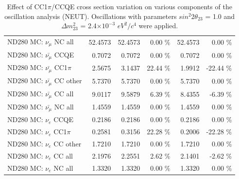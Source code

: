 \begin{table}
\begin{tabular}{| l | r | r  r | r  r |}
                                          ND280 MC: $\nu_{\mu}$ NC all &         52.4573 &         52.4573 &  0.00 \%  &         52.4573 &  0.00 \%  \\ 
                                      ND280 MC: $\bar{\nu_{\mu}}$ CCQE &          0.7072 &          0.7072 &  0.00 \%  &          0.7072 &  0.00 \%  \\ 
                                  ND280 MC: $\bar{\nu_{\mu}}$ CC1$\pi$ &          2.5675 &          3.1437 & 22.44 \%  &          1.9912 & -22.44 \%  \\ 
                                  ND280 MC: $\bar{\nu_{\mu}}$ CC other &          5.7370 &          5.7370 &  0.00 \%  &          5.7370 &  0.00 \%  \\ 
                                    ND280 MC: $\bar{\nu_{\mu}}$ CC all &          9.0117 &          9.5879 &  6.39 \%  &          8.4355 & -6.39 \%  \\ 
                                    ND280 MC: $\bar{\nu_{\mu}}$ NC all &          1.4559 &          1.4559 &  0.00 \%  &          1.4559 &  0.00 \%  \\ 
                                              ND280 MC: $\nu_{e}$ CCQE &          0.2186 &          0.2186 &  0.00 \%  &          0.2186 &  0.00 \%  \\ 
                                          ND280 MC: $\nu_{e}$ CC1$\pi$ &          0.2581 &          0.3156 & 22.28 \%  &          0.2006 & -22.28 \%  \\ 
                                          ND280 MC: $\nu_{e}$ CC other &          1.7210 &          1.7210 &  0.00 \%  &          1.7210 &  0.00 \%  \\ 
                                            ND280 MC: $\nu_{e}$ CC all &          2.1976 &          2.2551 &  2.62 \%  &          2.1401 & -2.62 \%  \\ 
                                            ND280 MC: $\nu_{e}$ NC all &          1.3320 &          1.3320 &  0.00 \%  &          1.3320 &  0.00 \%  \\ 
\hline
\end{tabular}
\caption{ 
  Effect of CC1$\pi$/CCQE cross section variation
  on various components of the oscillation analysis (NEUT).
  Oscillations with parameters $sin^{2}2\theta_{23}$ = 1.0 and $\Delta m^{2}_{23}$ = 2.4$\times10^{-3}$ $eV^{2}/c^{4}$ were applied.  
}
\label{tab:neut_xsec_cc1pi_to_ccqe}
\end{table}


%
%
%
%

